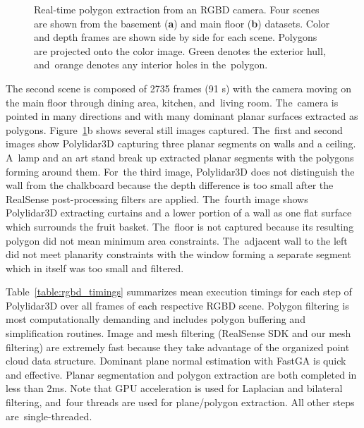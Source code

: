 \begin{figure}[H]
  \caption{Real-time polygon extraction from an RGBD camera. %
 Four scenes are shown from the basement (\textbf{a}) and main floor (\textbf{b}) datasets. Color and depth frames are shown side by side for each scene. Polygons are projected onto the color image. Green denotes the exterior hull, and~orange denotes any interior holes in the~polygon.}\label{fig:ch3_rgbd}
\end{figure}

The second scene is composed of 2735 frames (91 s) with the camera moving on the main floor through dining area, kitchen, and~living room. The~camera is pointed in many directions and with many dominant planar surfaces extracted as polygons. Figure~\ref{fig:ch3_rgbd}b shows several still images captured. The~first and second images show Polylidar3D capturing three planar segments on walls and a ceiling. A~lamp and an art stand break up extracted planar segments with the polygons forming around them. For~the third image, Polylidar3D does not distinguish the wall from the chalkboard because the depth difference is too small after the RealSense post-processing filters are applied.  The~fourth image shows Polylidar3D extracting curtains and a lower portion of a wall as one flat surface which surrounds the fruit basket. The~floor is not captured because its resulting polygon did not mean minimum area constraints. The~adjacent wall to the left did not meet planarity constraints with the window forming a separate segment which in itself was too small and filtered. 

Table~\ref{table:rgbd_timings} summarizes mean execution timings for each step of Polylidar3D over all frames of each respective RGBD scene. Polygon filtering is most computationally demanding and includes polygon buffering and simplification routines.  Image and mesh filtering (RealSense SDK and our mesh filtering) are extremely fast because they take advantage of the organized point cloud data structure. Dominant plane normal estimation with FastGA is quick and effective. Planar segmentation and polygon extraction are both completed in less than 2ms. Note that GPU acceleration is used for Laplacian and bilateral filtering, and~four threads are used for plane/polygon extraction. All other steps are~single-threaded.


